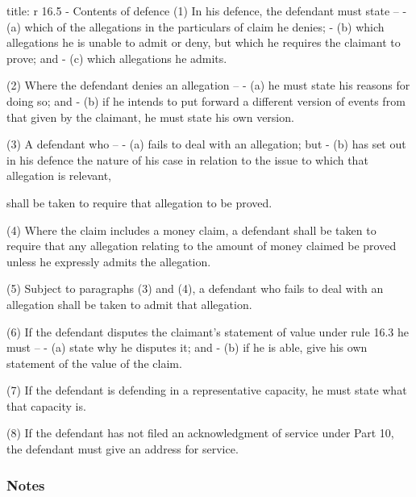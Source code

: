 \documentclass[
]{article}
\newenvironment{Shaded}{}{}
\newcommand{\NormalTok}[1]{#1}
\begin{document}
\begin{Shaded}
\begin{Highlighting}[]
\NormalTok{title: r 16.5 {-} Contents of defence}
\NormalTok{(1) In his defence, the defendant must state –}
\NormalTok{{-} (a) which of the allegations in the particulars of claim he denies;}
\NormalTok{{-} (b) which allegations he is unable to admit or deny, but which he requires the claimant to prove; and}
\NormalTok{{-} (c) which allegations he admits.}

\NormalTok{(2) Where the defendant denies an allegation –}
\NormalTok{{-} (a) he must state his reasons for doing so; and}
\NormalTok{{-} (b) if he intends to put forward a different version of events from that given by the claimant, he must state his own version.}

\NormalTok{(3) A defendant who –}
\NormalTok{{-} (a) fails to deal with an allegation; but}
\NormalTok{{-} (b) has set out in his defence the nature of his case in relation to the issue to which that allegation is relevant,}

\NormalTok{shall be taken to require that allegation to be proved.}

\NormalTok{(4) Where the claim includes a money claim, a defendant shall be taken to require that any allegation relating to the amount of money claimed be proved unless he expressly admits the allegation.}

\NormalTok{(5) Subject to paragraphs (3) and (4), a defendant who fails to deal with an allegation shall be taken to admit that allegation.}

\NormalTok{(6) If the defendant disputes the claimant’s statement of value under rule 16.3 he must –}
\NormalTok{{-} (a) state why he disputes it; and}
\NormalTok{{-} (b) if he is able, give his own statement of the value of the claim.}

\NormalTok{(7) If the defendant is defending in a representative capacity, he must state what that capacity is.}

\NormalTok{(8) If the defendant has not filed an acknowledgment of service under Part 10, the defendant must give an address for service.}
\end{Highlighting}
\end{Shaded}

\hypertarget{notes}{%
\subsubsection{Notes}\label{notes}}
\end{document}
